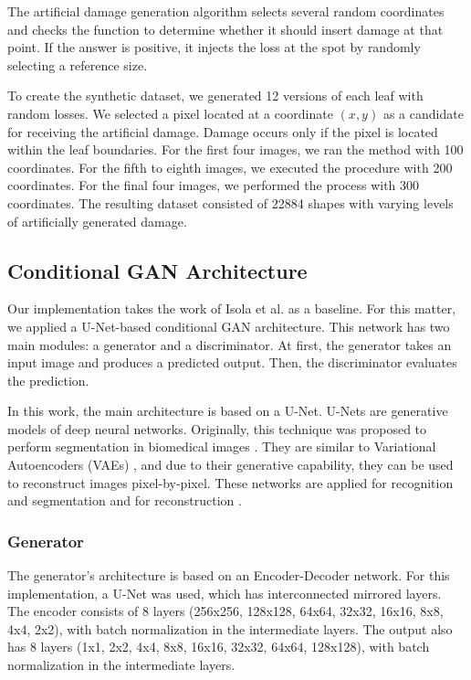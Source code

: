 The artificial damage generation algorithm selects several random coordinates and checks the function to determine whether it should insert damage at that point. If the answer is positive, it injects the loss at the spot by randomly selecting a reference size.

To create the synthetic dataset, we generated 12 versions of each leaf with random losses. We selected a pixel located at a coordinate $(x,y)$ as a candidate for receiving the artificial damage. Damage occurs only if the pixel is located within the leaf boundaries. For the first four images, we ran the method with 100 coordinates. For the fifth to eighth images, we executed the procedure with 200 coordinates. For the final four images, we performed the process with 300 coordinates. The resulting dataset consisted of 22884 shapes with varying levels of artificially generated damage.

\subsection{Conditional GAN Architecture}

Our implementation takes the work of Isola et al. \cite{isola2017image} as a baseline. For this matter, we applied a U-Net-based conditional GAN architecture. This network has two main modules: a generator and a discriminator. At first, the generator takes an input image and produces a predicted output. Then, the discriminator evaluates the prediction.

In this work, the main architecture is based on a U-Net. U-Nets are generative models of deep neural networks. Originally, this technique was proposed to perform segmentation in biomedical images \cite{ronneberger2015u}. They are similar to Variational Autoencoders (VAEs) \cite{hou2017deep}, and due to their generative capability, they can be used to reconstruct images pixel-by-pixel. These networks are applied for recognition and segmentation \cite{dong2017automatic,oktay2018attention} and for reconstruction \cite{hyun2018deep,antholzer2018photoacoustic}.

\subsubsection{Generator}

The generator's architecture is based on an Encoder-Decoder network. For this implementation, a U-Net was used, which has interconnected mirrored layers. The encoder consists of 8 layers (256x256, 128x128, 64x64, 32x32, 16x16, 8x8, 4x4, 2x2), with batch normalization in the intermediate layers. The output also has 8 layers (1x1, 2x2, 4x4, 8x8, 16x16, 32x32, 64x64, 128x128), with batch normalization in the intermediate layers.


